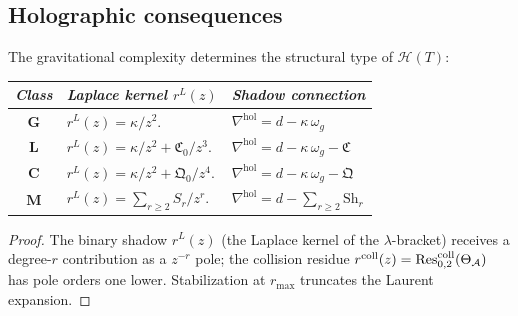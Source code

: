 \subsection{Holographic consequences}

\begin{theorem}
\ClaimStatusProvedHere
{}
The gravitational complexity determines the structural type of
$\mathcal{H}(T)$:
\begin{center}
\small
\renewcommand{\arraystretch}{1.25}
\begin{tabular}{c@{\quad}l@{\quad}l}
\toprule
\emph{Class} & \emph{Laplace kernel $r^L(z)$} &
\emph{Shadow connection} \\
\midrule
$\mathbf{G}$ &
 $r^L(z) = \kappa/z^2$. &
 $\nabla^{\mathrm{hol}} = d - \kappa\,\omega_g$ \\
$\mathbf{L}$ &
 $r^L(z) = \kappa/z^2 + \mathfrak{C}_0/z^3$. &
 $\nabla^{\mathrm{hol}} = d - \kappa\,\omega_g -
 \mathfrak{C}$ \\
$\mathbf{C}$ &
 $r^L(z) = \kappa/z^2 + \mathfrak{Q}_0/z^4$. &
 $\nabla^{\mathrm{hol}} = d - \kappa\,\omega_g -
 \mathfrak{Q}$ \\
$\mathbf{M}$ &
 $r^L(z) = \sum_{r\geq 2} S_r/z^r$. &
 $\nabla^{\mathrm{hol}} = d -
 \sum_{r\geq 2} \mathrm{Sh}_r$ \\
\bottomrule
\end{tabular}
\end{center}
\end{theorem}

\begin{proof}
The binary shadow $r^L(z)$ (the Laplace kernel of the
$\lambda$-bracket) receives a degree-$r$ contribution as a
$z^{-r}$ pole; the collision residue
$r^{\mathrm{coll}}(z) = \operatorname{Res}^{\mathrm{coll}}_{0,2}(\Theta_{\mathcal{A}})$
has pole orders one lower.
Stabilization at $r_{\max}$ truncates the Laurent expansion.
\end{proof}


